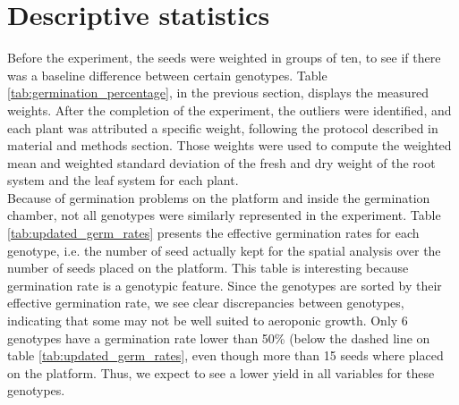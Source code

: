 \section{Descriptive statistics}
Before the experiment, the seeds were weighted in groups of ten, to see if there was a baseline difference between certain genotypes. Table \ref{tab:germination_percentage}, in the previous section, displays the measured weights.
After the completion of the experiment, the outliers were identified, and each plant was attributed a specific weight, following the protocol described in material and methods section. Those weights were used to compute the weighted mean and weighted standard deviation of the fresh and dry weight of the root system and the leaf system for each plant.\\

Because of germination problems on the platform and inside the germination chamber, not all genotypes were similarly represented in the experiment. Table \ref{tab:updated_germ_rates} presents the effective germination rates for each genotype, i.e. the number of seed actually kept for the spatial analysis over the number of seeds placed on the platform. This table is interesting because germination rate is a genotypic feature. Since the genotypes are sorted by their effective germination rate, we see clear discrepancies between genotypes, indicating that some may not be well suited to aeroponic growth. Only 6 genotypes have a germination rate lower than 50\% (below the dashed line on table \ref{tab:updated_germ_rates}, even though more than 15 seeds where placed on the platform. Thus, we expect to see a lower yield in all variables for these genotypes.

